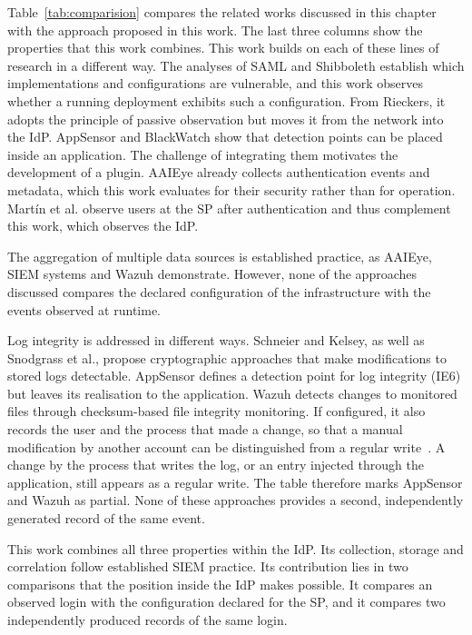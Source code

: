 \documentclass[../main.tex]{subfiles}
\begin{document}
Table~\ref{tab:comparision} compares the related works discussed in this chapter with the approach 
proposed in this work. 
The last three columns show the properties that this work combines. 
This work builds on each of these lines of research in a different way. 
The analyses of SAML and Shibboleth establish which implementations and configurations are 
vulnerable, and this work observes whether a running deployment exhibits such a configuration. 
From Rieckers, it adopts the principle of passive observation but moves it from the network into 
the IdP. 
AppSensor and BlackWatch show that detection points can be placed inside an application. 
The challenge of integrating them motivates the development of a plugin. 
AAIEye already collects authentication events and metadata, which this work evaluates for their 
security rather than for operation. 
Martín et al. observe users at the SP after authentication and thus complement this work, which 
observes the IdP. 

The aggregation of multiple data sources is established practice, as AAIEye, SIEM 
systems and Wazuh demonstrate. 
However, none of the approaches discussed compares the declared configuration of the 
infrastructure with the events observed at runtime. 

Log integrity is addressed in different ways. 
Schneier and Kelsey, as well as Snodgrass et al., propose cryptographic approaches that make 
modifications to stored logs detectable. 
AppSensor defines a detection point for log integrity (IE6) but leaves its realisation to the 
application. 
Wazuh detects changes to monitored files through checksum-based file integrity monitoring. 
If configured, it also records the user and the process that made a change, so that a manual 
modification by another account can be distinguished from a regular write~\cite{WazuhDocumentation}. 
A change by the process that writes the log, or an entry injected through the application, still 
appears as a regular write. 
The table therefore marks AppSensor and Wazuh as partial. 
None of these approaches provides a second, independently generated record of the same event. 

This work combines all three properties within the IdP. 
Its collection, storage and correlation follow established SIEM practice. 
Its contribution lies in two comparisons that the position inside the IdP makes possible. 
It compares an observed login with the configuration declared for the SP, and it compares two 
independently produced records of the same login. 
\end{document}
